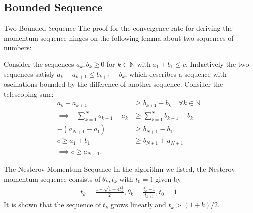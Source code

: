 \documentclass[11pt]{beamer}
\begin{document}
    \subsection{Bounded Sequence}
        \begin{frame}{Two Bounded Sequence}
            The proof for the convergence rate for deriving the momentum sequence hinges on the following lemma about two sequences of numbers:
            \begin{lemma}
                Consider the sequences $a_k, b_k \ge 0$ for $k\in \mathbb N$ with $a_1 + b_1 \le c$. Inductively the two sequences satisfy $a_{k} - a_{k + 1} \le b_{k + 1} - b_k$, which describes a sequence with oscillations bounded by the difference of another sequence. Consider the telescoping sum: 
                \begin{align*}
                    a_{k} - a_{k + 1} 
                    &\ge b_{k + 1} - b_k \quad \forall k \in \mathbb N
                    \\
                    \implies
                    -\sum_{k = 1}^{N}
                    a_{k + 1} - a_k 
                    &\ge 
                    \sum_{k = 1}^{N} b_{k + 1} - b_k
                    \\
                    - (a_{N + 1} - a_1) 
                    &\ge b_{N + 1} - b_1
                    \\
                    c\ge a_1 + b_1
                    &\ge
                    b_{N + 1} + a_{N +1}
                    \\
                    \implies c \ge a_{N+1}. 
                \end{align*}
            \end{lemma}
        \end{frame}    
    \begin{frame}{The Nesterov Momentum Sequence}
        In the algorithm we listed, the Nesterov momentum sequence consists of $\theta_k, t_k$ with $t_0 = 1$ given by
        \begin{align}
            t_k = \frac{1 + \sqrt{1 + 4t_k^2}}{2}, \theta_k = \frac{t_k - 1}{t_{k + 1}}, t_0 = 1
        \end{align}
        It is shown that the sequence of $t_k$ grows linearly and $t_k > (1 + k)/2$. 
    \end{frame}
\end{document}
